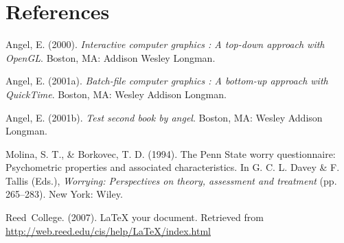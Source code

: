 \documentclass[print]{nuthesis}
\newlength{\cslhangindent}
\newenvironment{CSLReferences}%
{\setlength{\parindent}{0pt}%
\everypar{\setlength{\hangindent}{\cslhangindent}}\ignorespaces}%
{\par}
\begin{document}
\backmatter

\hypertarget{references}{%
\chapter*{References}\label{references}}

\noindent

\setlength{\parindent}{-0.20in}
\setlength{\leftskip}{0.20in}
\setlength{\parskip}{8pt}

\hypertarget{refs}{}
\begin{CSLReferences}{1}{0}
\leavevmode\hypertarget{ref-angel2000}{}%
Angel, E. (2000). \emph{Interactive computer graphics : A top-down approach with OpenGL}. Boston, MA: Addison Wesley Longman.

\leavevmode\hypertarget{ref-angel2001}{}%
Angel, E. (2001a). \emph{Batch-file computer graphics : A bottom-up approach with QuickTime}. Boston, MA: Wesley Addison Longman.

\leavevmode\hypertarget{ref-angel2002a}{}%
Angel, E. (2001b). \emph{Test second book by angel}. Boston, MA: Wesley Addison Longman.

\leavevmode\hypertarget{ref-Molina1994}{}%
Molina, S. T., \& Borkovec, T. D. (1994). The {P}enn {S}tate worry questionnaire: Psychometric properties and associated characteristics. In G. C. L. Davey \& F. Tallis (Eds.), \emph{Worrying: Perspectives on theory, assessment and treatment} (pp. 265--283). New York: Wiley.

\leavevmode\hypertarget{ref-reedweb2007}{}%
Reed~College. (2007). LaTeX your document. Retrieved from \url{http://web.reed.edu/cis/help/LaTeX/index.html}

\end{CSLReferences}


\backmatter

% 






\end{document}
